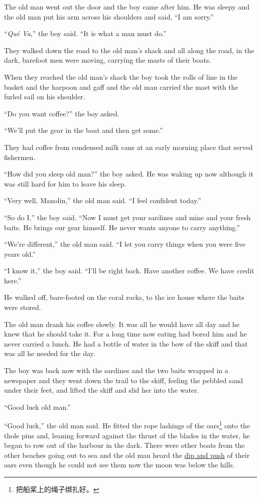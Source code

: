 \documentclass[fontset=ubuntu,zihao=-4]{ctexrep}
\begin{document}
The old man went out the door and the boy came after him. He was sleepy and
the old man put his arm across his shoulders and said, ``I am sorry.''

``\emph{Qué Va},'' the boy said. ``It is what a man must do.''

They walked down the road to the old man's shack and all along the road, in
the dark, barefoot men were moving, carrying the masts of their boats.

When they \gls{reached} the old man's shack the boy took the rolls of line
in the basket and the harpoon and gaff and the old man carried the mast with
the furled sail on his shoulder.

``Do you want coffee?'' the boy asked.

``We'll put the gear in the boat and then get some.''

They had coffee from \gls{condensed} milk cans at an early morning place that served fishermen.

``How did you sleep old man?'' the boy asked. He was waking up now \gls{although}
it was still hard for him to leave his sleep.

``Very well, Manolin,'' the old man said. ``I feel confident today.''

``So do I,'' the boy said. ``Now I must get your sardines and mine and your
fresh baits. He brings our gear himself. He never wants anyone to carry
anything.''

``We're different,'' the old man said. ``I let you carry things when you were five years old.''

``I know it,'' the boy said. ``I'll be right back. Have another coffee. We have \gls{credit} here.''

He walked off, bare-footed on the \gls{coral} rocks, to the ice house where
the baits were stored.

The old man drank his coffee slowly. It was all he would have all day and he
knew that he should take it. For a long time now eating had bored him and he
never carried a lunch. He had a bottle of water in the bow of the
skiff and that was all he needed for the day.

The boy was back now with the sardines and the two baits wrapped in a
newspaper and they went down the \gls{trail} to the skiff, feeling the
\gls{pebbled} sand under their feet, and \gls{lifted} the skiff and
\gls{slid} her into the water.

``Good luck old man.''

``Good luck,'' the old man said. He fitted the rope lashings of the
\glspl{oar}\footnote{把船桨上的绳子绑扎好。} onto the \gls{thole}
\glspl{pin} and, \gls{leaning} forward against the \gls{thrust} of the
\glspl{blade} in the water, he began to row out of the harbour in the dark.
There were other boats from the other beaches going out to sea and the old
man heard the \uline{\gls{dip} and push} of their oars even though he could
not see them now the moon was below the hills.
\end{document}
